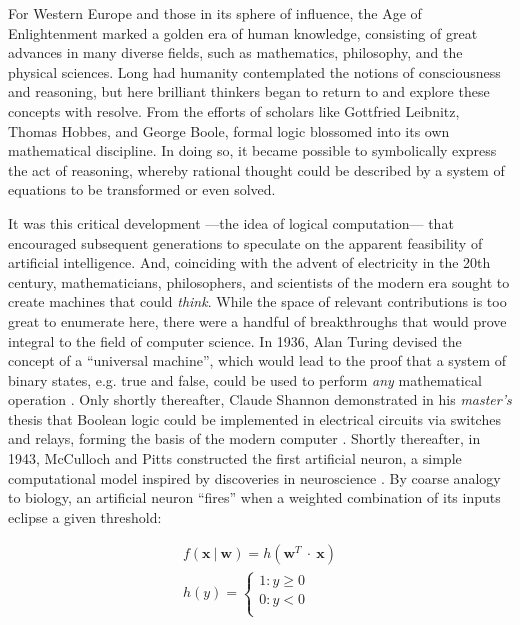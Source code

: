 For Western Europe and those in its sphere of influence, the Age of Enlightenment marked a golden era of human knowledge, consisting of great advances in many diverse fields, such as mathematics, philosophy, and the physical sciences.
Long had humanity contemplated the notions of consciousness and reasoning, but here brilliant thinkers began to return to and explore these concepts with resolve.
From the efforts of scholars like Gottfried Leibnitz, Thomas Hobbes, and George Boole, formal logic blossomed into its own mathematical discipline.
In doing so, it became possible to symbolically express the act of reasoning, whereby rational thought could be described by a system of equations to be transformed or even solved.

It was this critical development ---the idea of logical computation--- that encouraged subsequent generations to speculate on the apparent feasibility of artificial intelligence.
And, coinciding with the advent of electricity in the 20th century, mathematicians, philosophers, and scientists of the modern era sought to create machines that could \emph{think}.
While the space of relevant contributions is too great to enumerate here, there were a handful of breakthroughs that would prove integral to the field of computer science.
In 1936, Alan Turing devised the concept of a ``universal machine'', which would lead to the proof that a system of binary states, e.g. true and false, could be used to perform \emph{any} mathematical operation \cite{Turing1936Computable}.
Only shortly thereafter, Claude Shannon demonstrated in his \emph{master's} thesis that Boolean logic could be implemented in electrical circuits via switches and relays, forming the basis of the modern computer \cite{Shannon1938Symbolic}.
Shortly thereafter, in 1943, McCulloch and Pitts constructed the first artificial neuron, a simple computational model inspired by discoveries in neuroscience \cite{Mcculloch1943Logical}.
By coarse analogy to biology, an artificial neuron ``fires'' when a weighted combination of its inputs eclipse a given threshold:

\begin{align*}
  f(\mathbf{x}~|~\mathbf{w}) = h(\mathbf{w}^T~\cdot~\mathbf{x})\\
  h(y) = \left\{
    \begin{array}{ll}
      1 : y \ge 0\\
      0 : y < 0\\
    \end{array}
  \right.
\label{eq:perceptron}
\end{align*}

